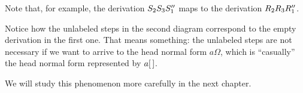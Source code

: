 \begin{example}
Note that, for example, the derivation $S_2 S_3 S_1''$ maps to
the derivation $R_2 R_3 R_1''$.


Notice how the unlabeled steps in the second diagram correspond to the empty derivation
in the first one.
That means something: the unlabeled
steps are not necessary if we want to arrive to the head normal form $a \Omega$,
which is ``casually'' the head normal form represented by $a [\,]$.

We will study this phenomenon more carefully in the next chapter.
\end{example}
